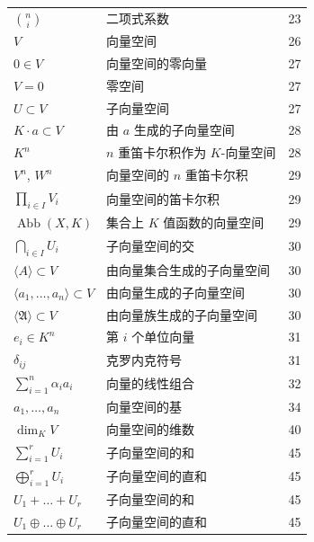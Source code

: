 \begin{longtable}{@{}l l r}
$\binom{n}{i}$ & 二项式系数 & 23 \\
$V$ & 向量空间 & 26 \\
$0 \in V$ & 向量空间的零向量 & 27 \\
$V = 0$ & 零空间 & 27 \\
$U \subset V$ & 子向量空间 & 27 \\
$K \cdot a \subset V$ & 由 $a$ 生成的子向量空间 & 28 \\
$K^n$ & $n$ 重笛卡尔积作为 $K$-向量空间 & 28 \\
$V^n$, $W^n$ & 向量空间的 $n$ 重笛卡尔积 & 29 \\
$\prod_{i \in I} V_i$ & 向量空间的笛卡尔积 & 29 \\
$\operatorname{Abb}(X, K)$ & 集合上 $K$ 值函数的向量空间 & 29 \\
$\bigcap_{i \in I} U_i$ & 子向量空间的交 & 30 \\
$\langle A \rangle \subset V$ & 由向量集合生成的子向量空间 & 30 \\
$\langle a_1, \ldots, a_n \rangle \subset V$ & 由向量生成的子向量空间 & 30 \\
$\langle \mathfrak{A} \rangle \subset V$ & 由向量族生成的子向量空间 & 30 \\
$e_i \in K^n$ & 第 $i$ 个单位向量 & 31 \\
$\delta_{ij}$ & 克罗内克符号 & 31 \\
$\sum_{i = 1}^{n} \alpha_i a_i$ & 向量的线性组合 & 32 \\
$a_1, \ldots, a_n$ & 向量空间的基 & 34 \\
$\dim_K V$ & 向量空间的维数 & 40 \\
$\sum_{i = 1}^{r} U_i$ & 子向量空间的和 & 45 \\
$\bigoplus_{i = 1}^{r} U_i$ & 子向量空间的直和 & 45 \\
$U_1 + \ldots + U_r$ & 子向量空间的和 & 45 \\
$U_1 \oplus \ldots \oplus U_r$ & 子向量空间的直和 & 45 \\
\hline


\end{longtable}
